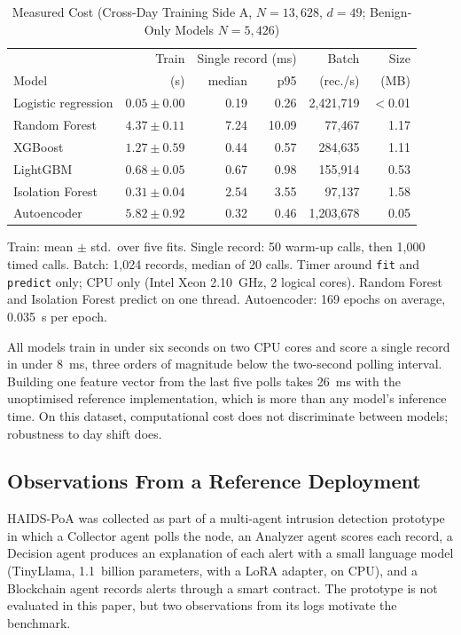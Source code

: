 \documentclass[journal]{IEEEtran}
\newcommand{\code}[1]{\texttt{\small #1}}
\begin{document}
\begin{table}[t]
\caption{Measured Cost (Cross-Day Training Side A, $N=13{,}628$, $d=49$; Benign-Only Models $N=5{,}426$)}\label{tab:cost}
\centering\footnotesize
\setlength{\tabcolsep}{3.2pt}
\begin{tabular}{@{}lrrrrr@{}}
\toprule
 & Train & \multicolumn{2}{c}{Single record (ms)} & Batch & Size \\
Model & (s) & median & p95 & (rec./s) & (MB) \\
\midrule
Logistic regression & $0.05 \pm 0.00$ & 0.19 & 0.26 & 2{,}421{,}719 & $<$0.01 \\
Random Forest & $4.37 \pm 0.11$ & 7.24 & 10.09 & 77{,}467 & 1.17 \\
XGBoost & $1.27 \pm 0.59$ & 0.44 & 0.57 & 284{,}635 & 1.11 \\
LightGBM & $0.68 \pm 0.05$ & 0.67 & 0.98 & 155{,}914 & 0.53 \\
Isolation Forest & $0.31 \pm 0.04$ & 2.54 & 3.55 & 97{,}137 & 1.58 \\
Autoencoder & $5.82 \pm 0.92$ & 0.32 & 0.46 & 1{,}203{,}678 & 0.05 \\
\bottomrule
\end{tabular}
\vspace{2pt}

{\raggedright\scriptsize Train: mean $\pm$ std.\ over five fits. Single record: 50 warm-up calls, then 1{,}000 timed calls. Batch: 1{,}024 records, median of 20 calls. Timer around \code{fit} and \code{predict} only; CPU only (Intel Xeon 2.10~GHz, 2 logical cores). Random Forest and Isolation Forest predict on one thread. Autoencoder: 169 epochs on average, 0.035~s per epoch.\par}
\end{table}

All models train in under six seconds on two CPU cores and score a single record in under 8~ms, three orders of magnitude below the two-second polling interval. Building one feature vector from the last five polls takes 26~ms with the unoptimised reference implementation, which is more than any model's inference time. On this dataset, computational cost does not discriminate between models; robustness to day shift does.

\subsection{Observations From a Reference Deployment}\label{sec:deployment}
HAIDS-PoA was collected as part of a multi-agent intrusion detection prototype in which a Collector agent polls the node, an Analyzer agent scores each record, a Decision agent produces an explanation of each alert with a small language model (TinyLlama, 1.1~billion parameters, with a LoRA adapter, on CPU), and a Blockchain agent records alerts through a smart contract. The prototype is not evaluated in this paper, but two observations from its logs motivate the benchmark.
\end{document}
